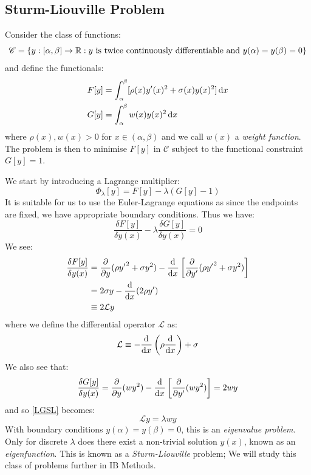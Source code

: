 \documentclass[../main.tex]{subfiles}
\begin{document}
\subsection{Sturm-Liouville Problem} \label{SLPSec}
Consider the class of functions:
\[
  \mathscr{C} = \{y: [\alpha , \beta] \to \mathbb{R}: y \text{ is twice continuously differentiable and } y(\alpha) = y(\beta) = 0\}
\]
and define the functionals:
\begin{align*}
  F[y] &= \int_{\alpha}^{\beta} [\rho(x) y'(x)^2 + \sigma(x) y(x)^2] \d{x} \\
  G[y] &= \int_{\alpha}^{\beta} w(x) y(x)^2 \d{x}
\end{align*}
where $\rho(x), w(x) > 0$ for $x \in (\alpha, \beta)$ and we call $w(x)$ a \textit{weight function}.
The problem is then to minimise $F[y]$ in $\mathscr{C}$ subject to the functional constraint $G[y] = 1$.

We start by introducing a Lagrange multiplier:
\[
  \Phi_{\lambda}[y] = F[y] - \lambda(G[y] - 1)
\]
It is suitable for us to use the Euler-Lagrange equations as since the endpoints are fixed, we have appropriate boundary conditions.
Thus we have:
\begin{equation}
  \frac{\delta F[y]}{\delta y(x)} - \lambda \frac{\delta G[y]}{\delta y(x)} = 0 \tag{$\star$} \label{LGSL}
\end{equation}
We see:
\begin{align*}
  \frac{\delta F[y]}{\delta y(x)} &= \pderiv{}{y}(\rho {y'}^2 + \sigma y^2) - \deriv{}{x}\left[\pderiv{}{y'}(\rho {y'}^2 + \sigma y^2)\right] \\
                                  &= 2\sigma y - \deriv{}{x}(2 \rho y') \\
                                  &\equiv 2 \mathcal{L} y
\end{align*}
where we define the differential operator $\mathcal{L}$ as:
\[
  \mathcal{L} \equiv -\deriv{}{x}\left(\rho \deriv{}{x}\right) + \sigma
\]
We also see that:
\[
  \frac{\delta G[y]}{\delta y(x)} = \pderiv{}{y}(w y^2) - \deriv{}{x}\left[\pderiv{}{y'}(w y^2)\right] = 2wy
\]
and so \cref{LGSL} becomes:
\begin{equation}
  \mathcal{L} y = \lambda w y \tag{$\dag$} \label{SLP}
\end{equation}
With boundary conditions $y(\alpha) = y(\beta) = 0$, this is an \textit{eigenvalue problem}.
Only for discrete $\lambda$ does there exist a non-trivial solution $y(x)$, known as an \textit{eigenfunction}.
This is known as a \textit{Sturm-Liouville} problem;
We will study this class of problems further in IB Methods.
\end{document}
